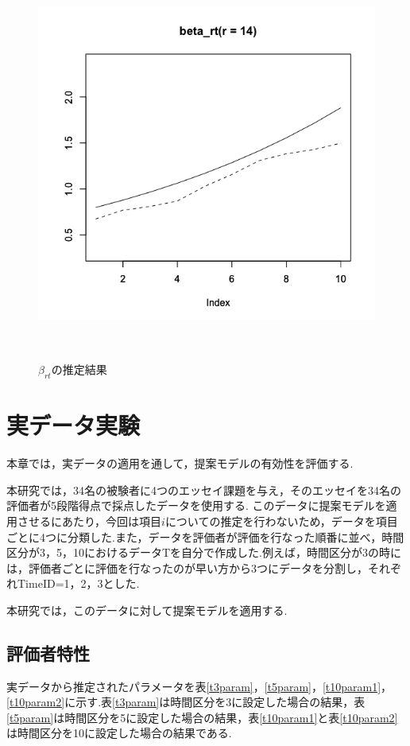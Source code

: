 \documentclass[a4paper,11pt,oneside,openany]{jsbook}
\begin{document}
\begin{figure}[]
\begin{minipage}[b]{0.3\linewidth}
  \label{2}
 \end{minipage}
 \begin{minipage}[b]{0.3\linewidth}
  \centering
  \includegraphics[keepaspectratio,scale=0.25]{img/beta_rt_3.png}
  \label{3}
 \end{minipage}\\
 \caption{$\beta_{rt}$の推定結果}\label{beta_rt_recovery}
\end{figure}

\newpage
\chapter{実データ実験}
本章では，実データの適用を通して，提案モデルの有効性を評価する.

本研究では，34名の被験者に4つのエッセイ課題を与え，そのエッセイを34名の評価者が5段階得点で採点したデータを使用する.
このデータに提案モデルを適用させるにあたり，今回は項目$i$についての推定を行わないため，データを項目ごとに4つに分類した.また，データを評価者が評価を行なった順番に並べ，時間区分が3，5，10におけるデータTを自分で作成した.例えば，時間区分が3の時には，評価者ごとに評価を行なったのが早い方から3つにデータを分割し，それぞれTimeID=1，2，3とした.

本研究では，このデータに対して提案モデルを適用する.
\section{評価者特性}
実データから推定されたパラメータを表\ref{t3param}，\ref{t5param}，\ref{t10param1}，\ref{t10param2}に示す.表\ref{t3param}は時間区分を3に設定した場合の結果，表\ref{t5param}は時間区分を5に設定した場合の結果，表\ref{t10param1}と表\ref{t10param2}は時間区分を10に設定した場合の結果である.
\end{document}
